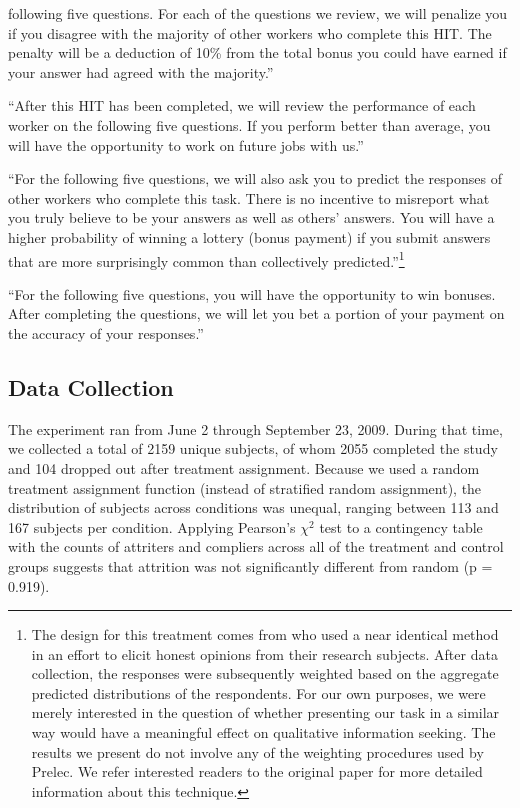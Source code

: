 \documentclass{chi2009}
\begin{document}
{\begin{description}
  following five questions. For each of the questions we review, we
  will penalize you if you disagree with the majority of other workers
  who complete this HIT. The penalty will be a deduction of 10\% from
  the total bonus you could have earned if your answer had agreed with
  the majority.'' %
\item[Promise of Future Work (financial)] ``After this HIT has been
  completed, we will review the performance of each worker on the
  following five questions. If you perform better than average, you
  will have the opportunity to work on future jobs with us.'' %
\item[Bayesian Truth Serum or BTS (financial)] ``For the following
  five questions, we will also ask you to predict the responses of
  other workers who complete this task. There is no incentive to
  misreport what you truly believe to be your answers as well as
  others' answers. You will have a higher probability of winning a
  lottery (bonus payment) if you submit answers that are more
  surprisingly common than collectively predicted.''\footnote{The
    design for this treatment comes from \cite{prelec_bts_2004} who
    used a near identical method in an effort to elicit honest
    opinions from their research subjects. After data collection, the
    responses were subsequently weighted based on the aggregate
    predicted distributions of the respondents. For our own purposes,
    we were merely interested in the question of whether presenting
    our task in a similar way would have a meaningful effect on
    qualitative information seeking. The results we present do not
    involve any of the weighting procedures used by Prelec. We refer
    interested readers to the original paper for more detailed
    information about this technique.}
\item[Betting on Results (financial)] ``For the following five
  questions, you will have the opportunity to win bonuses. After
  completing the questions, we will let you bet a portion of your
  payment on the accuracy of your responses.'' %
\end{description} 

\subsection{Data Collection}
The experiment ran from June 2 through September 23, 2009. During that
time, we collected a total of 2159 unique subjects, of whom 2055
completed the study and 104 dropped out after treatment
assignment. Because we used a random treatment assignment function
(instead of stratified random assignment), the distribution of
subjects across conditions was unequal, ranging between 113 and 167
subjects per condition. Applying Pearson's $\chi^{2}$ test to a
contingency table with the counts of attriters and compliers across
all of the treatment and control groups suggests that attrition was
not significantly different from random (p = 0.919).

}
\end{document}
